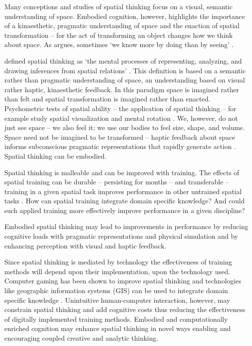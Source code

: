 Many conceptions and studies of spatial thinking focus on a visual, semantic understanding of space. 
Embodied cognition, however, highlights the importance of a kinaesthetic, pragmatic understanding of space
and the enaction of spatial transformation -- for the act of transforming an object changes how we think about space. 
As \cite{Kirsh2013} argues, sometimes `we know more by doing than by seeing' \cite{Kirsh2013}.


\cite{Uttal2013} defined spatial thinking as 
`the mental processes of representing, analyzing, and drawing inferences from spatial relations' \cite{Uttal2013}. 
This definition is based on a semantic rather than pragmatic understanding of space, an understanding based on visual rather haptic, kinaesthetic feedback. 
In this paradigm space is imagined rather than felt and spatial transformation is imagined rather than enacted. 
Psychometric tests of spatial ability -- the application of spatial thinking -- for example study spatial visualization and mental rotation \cite{Uttal2013,Uttal2013a,Ormand2014}.
We, however, do not just see space -- we also feel it; we use our bodies to feel size, shape, and volume. 
Space need not be imagined to be transformed -- haptic feedback about space informs subconscious pragmatic representations that rapidly generate action \cite{Jeannerod1997}. Spatial thinking can be embodied.

Spatial thinking is malleable and can be improved with training. 
The effects of spatial training can be durable -- persisting for months -- and transferable -- training in a given spatial task improves performance in other untrained spatial tasks \cite{Uttal2013}. 
How can spatial training integrate domain specific knowledge? And could such applied training more effectively improve performance in a given discipline? \cite{Uttal2013} 

Embodied spatial thinking may lead to improvements in performance by reducing cognitive loads with pragmatic representations and physical simulation and by enhancing perception with visual and haptic feedback. 

Since spatial thinking is mediated by technology the effectiveness of training methods will depend upon their implementation, upon the technology used. 
Computer gaming has been shown to improve spatial thinking and technologies like geographic information systems (GIS) can be used to integrate domain specific knowledge \cite{Uttal2013}.
Unintuitive human-computer interaction, however, may constrain spatial thinking and add cognitive costs thus reducing the effectiveness of digitally implemented training methods. 
Embodied and computationally enriched cognition may enhance spatial thinking in novel ways
enabling and encouraging coupled creative and analytic thinking.


